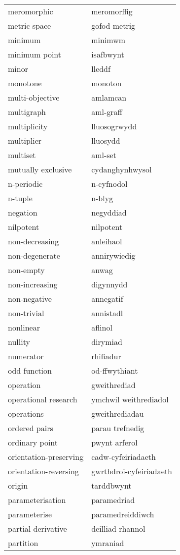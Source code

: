 \begin{supertabular}{p{0.22\textwidth}p{0.22\textwidth}}
meromorphic & meromorffig \\
metric space & gofod metrig \\
minimum & minimwm \\
minimum point & isafbwynt \\
minor & lleddf \\
monotone & monoton \\
multi-objective & amlamcan \\
multigraph & aml-graff \\
multiplicity & lluosogrwydd \\
multiplier & lluosydd \\
multiset & aml-set \\
mutually exclusive & cydanghynhwysol \\
n-periodic & n-cyfnodol \\
n-tuple & n-blyg \\
negation & negyddiad \\
nilpotent & nilpotent \\
non-decreasing & anleihaol \\
non-degenerate & annirywiedig \\
non-empty & anwag \\
non-increasing & digynnydd \\
non-negative & annegatif \\
non-trivial & annistadl \\
nonlinear & aflinol \\
nullity & dirymiad \\
numerator & rhifiadur \\
odd function & od-ffwythiant \\
operation & gweithrediad \\
operational research & ymchwil weithrediadol \\
operations & gweithrediadau \\
ordered pairs & parau trefnedig \\
ordinary point & pwynt arferol \\
orientation-preserving & cadw-cyfeiriadaeth \\
orientation-reversing & gwrthdroi-cyfeiriadaeth \\
origin & tarddbwynt \\
parameterisation & paramedriad \\
parameterise & paramedreiddiwch \\
partial derivative & deilliad rhannol \\
partition & ymraniad \\

\end{supertabular}
